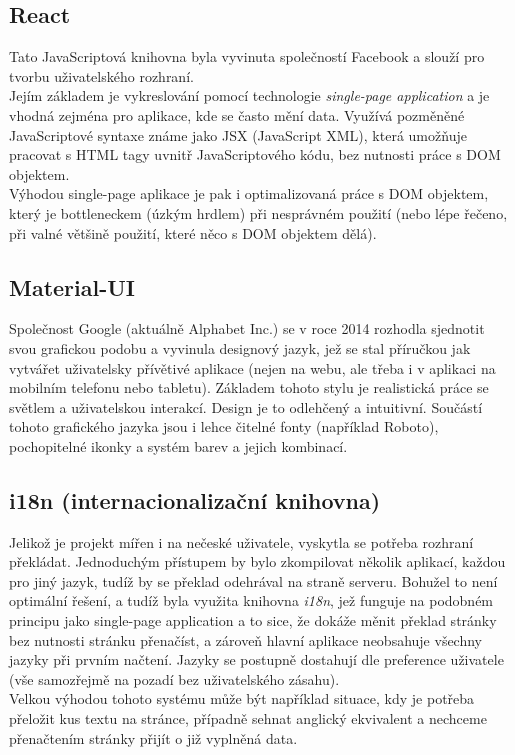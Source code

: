 \subsection{React}
Tato JavaScriptová knihovna byla vyvinuta společností Facebook a slouží pro tvorbu uživatelského rozhraní.\\
Jejím základem je vykreslování pomocí technologie \textit{single-page application} a je vhodná zejména pro aplikace, kde se často mění data.
Využívá pozměněné JavaScriptové syntaxe známe jako JSX (JavaScript XML), která umožňuje
pracovat s HTML tagy uvnitř JavaScriptového kódu, bez nutnosti práce s DOM objektem.\\
Výhodou single-page aplikace je pak i optimalizovaná práce s DOM objektem, který je bottleneckem
(úzkým hrdlem) při nesprávném použití (nebo lépe řečeno, při valné většině použití, které
něco s DOM objektem dělá).

\subsection{Material-UI}
Společnost Google (aktuálně Alphabet Inc.) se v roce 2014 rozhodla sjednotit svou grafickou podobu a
vyvinula designový jazyk, jež se stal příručkou jak vytvářet uživatelsky přívětivé aplikace
(nejen na webu, ale třeba i v aplikaci na mobilním telefonu nebo tabletu).
Základem tohoto stylu je realistická práce se světlem a uživatelskou interakcí.
Design je to odlehčený a intuitivní. Součástí tohoto grafického jazyka jsou i
lehce čitelné fonty (například Roboto), pochopitelné ikonky a systém barev a jejich kombinací.

\subsection{i18n (internacionalizační knihovna)}
Jelikož je projekt mířen i na nečeské uživatele, vyskytla se potřeba rozhraní překládat.
Jednoduchým přístupem by bylo zkompilovat několik aplikací, každou pro jiný jazyk, tudíž
by se překlad odehrával na straně serveru. Bohužel to není optimální řešení, a
tudíž byla využita knihovna \textit{i18n}, jež funguje na podobném principu jako single-page application a
to sice, že dokáže měnit překlad stránky bez nutnosti stránku přenačíst, a zároveň hlavní aplikace
neobsahuje všechny jazyky při prvním načtení. Jazyky se postupně dostahují dle preference uživatele
(vše samozřejmě na pozadí bez uživatelského zásahu).\\
Velkou výhodou tohoto systému může být například situace, kdy je potřeba přeložit kus textu na stránce,
případně sehnat anglický ekvivalent a nechceme přenačtením stránky přijít o již vyplněná data.

